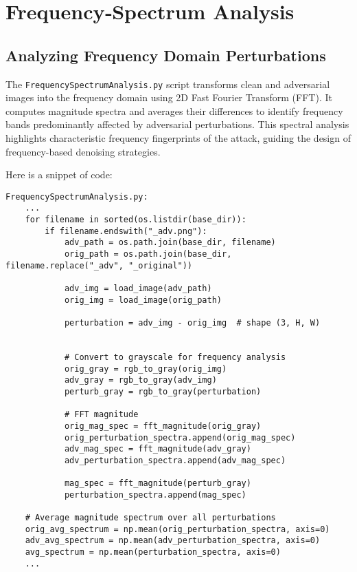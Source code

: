 \documentclass[a4paper,12pt]{report}
\begin{document}
\chapter{Frequency‑Spectrum Analysis}
\section{Analyzing Frequency Domain Perturbations}
The \texttt{FrequencySpectrumAnalysis.py} script transforms clean and adversarial images into the frequency domain using 2D Fast Fourier Transform (FFT). It computes magnitude spectra and averages their differences to identify frequency bands predominantly affected by adversarial perturbations. This spectral analysis highlights characteristic frequency fingerprints of the attack, guiding the design of frequency-based denoising strategies.

Here is a snippet of code:

\begin{verbatim}
FrequencySpectrumAnalysis.py:
    ...
    for filename in sorted(os.listdir(base_dir)):
        if filename.endswith("_adv.png"):
            adv_path = os.path.join(base_dir, filename)
            orig_path = os.path.join(base_dir, filename.replace("_adv", "_original"))

            adv_img = load_image(adv_path)
            orig_img = load_image(orig_path)

            perturbation = adv_img - orig_img  # shape (3, H, W)


            # Convert to grayscale for frequency analysis
            orig_gray = rgb_to_gray(orig_img)
            adv_gray = rgb_to_gray(adv_img)
            perturb_gray = rgb_to_gray(perturbation)

            # FFT magnitude
            orig_mag_spec = fft_magnitude(orig_gray)
            orig_perturbation_spectra.append(orig_mag_spec)
            adv_mag_spec = fft_magnitude(adv_gray)
            adv_perturbation_spectra.append(adv_mag_spec)

            mag_spec = fft_magnitude(perturb_gray)
            perturbation_spectra.append(mag_spec)

    # Average magnitude spectrum over all perturbations
    orig_avg_spectrum = np.mean(orig_perturbation_spectra, axis=0)
    adv_avg_spectrum = np.mean(adv_perturbation_spectra, axis=0)
    avg_spectrum = np.mean(perturbation_spectra, axis=0)
    ...
\end{verbatim}
\end{document}
